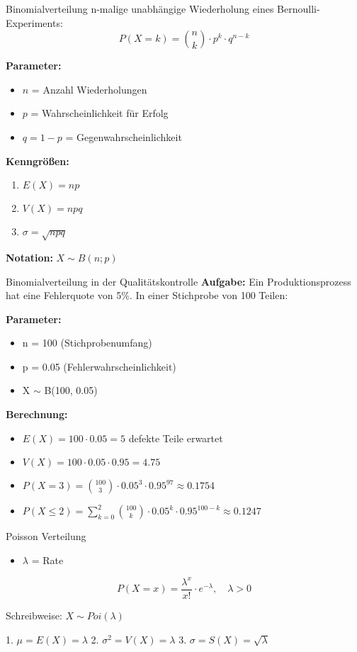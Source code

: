 \begin{definition}{Binomialverteilung}
n-malige unabhängige Wiederholung eines Bernoulli-Experiments:
$$P(X=k) = \binom{n}{k} \cdot p^k \cdot q^{n-k}$$

\textbf{Parameter:}
\begin{itemize}
    \item $n$ = Anzahl Wiederholungen
    \item $p$ = Wahrscheinlichkeit für Erfolg
    \item $q = 1-p$ = Gegenwahrscheinlichkeit
\end{itemize}

\textbf{Kenngrößen:}
\begin{enumerate}
    \item $E(X) = np$
    \item $V(X) = npq$
    \item $\sigma = \sqrt{npq}$
\end{enumerate}

\textbf{Notation:} $X \sim B(n;p)$
\end{definition}

\begin{example2}{Binomialverteilung in der Qualitätskontrolle}
\textbf{Aufgabe:} Ein Produktionsprozess hat eine Fehlerquote von 5\%. In einer Stichprobe von 100 Teilen:

\textbf{Parameter:}
\begin{itemize}
\item n = 100 (Stichprobenumfang)
\item p = 0.05 (Fehlerwahrscheinlichkeit)
\item X $\sim$  B(100, 0.05)
\end{itemize}

\textbf{Berechnung:}
\begin{itemize}
\item $E(X) = 100 \cdot 0.05 = 5$ defekte Teile erwartet
\item $V(X) = 100 \cdot 0.05 \cdot 0.95 = 4.75$
\item $P(X=3) = \binom{100}{3} \cdot 0.05^3 \cdot 0.95^{97} \approx 0.1754$
\item $P(X \leq 2) = \sum_{k=0}^2 \binom{100}{k} \cdot 0.05^k \cdot 0.95^{100-k} \approx 0.1247$
\end{itemize}
\end{example2}



\begin{definition}{Poisson Verteilung}
\begin{itemize}
  \item $\lambda$ = Rate
\end{itemize}

$$P(X=x) = \frac{\lambda^x}{x!} \cdot e^{-\lambda}, \quad \lambda > 0$$

Schreibweise: $X \sim Poi(\lambda)$

1. $\mu = E(X) = \lambda$
2. $\sigma^2 = V(X) = \lambda$
3. $\sigma = S(X) = \sqrt{\lambda}$
\end{definition}

